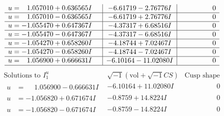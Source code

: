 \documentclass[1p]{elsarticle_modified}
\theoremstyle{definition}
\newcommand{\I}{\sqrt{-1}}
\begin{document}
$$\begin{array}{c|c|c}
\begin{aligned}
u &= \phantom{-}1.057010 + 0.636565 I\end{aligned}
 & -6.61719 - 2.76776 I & \phantom{-0.000000 } 0 \\ \hline\begin{aligned}
u &= \phantom{-}1.057010 - 0.636565 I\end{aligned}
 & -6.61719 + 2.76776 I & \phantom{-0.000000 } 0 \\ \hline\begin{aligned}
u &= -1.055470 + 0.647367 I\end{aligned}
 & -4.37317 + 6.68516 I & \phantom{-0.000000 } 0 \\ \hline\begin{aligned}
u &= -1.055470 - 0.647367 I\end{aligned}
 & -4.37317 - 6.68516 I & \phantom{-0.000000 } 0 \\ \hline\begin{aligned}
u &= -1.054270 + 0.658260 I\end{aligned}
 & -4.18744 + 7.02467 I & \phantom{-0.000000 } 0 \\ \hline\begin{aligned}
u &= -1.054270 - 0.658260 I\end{aligned}
 & -4.18744 - 7.02467 I & \phantom{-0.000000 } 0 \\ \hline\begin{aligned}
u &= \phantom{-}1.056900 + 0.666631 I\end{aligned}
 & -6.10164 - 11.02080 I & \phantom{-0.000000 } 0\\
 \hline 
 \end{array}$$\newpage$$\begin{array}{c|c|c}  
\text{Solutions to }I^u_{1}& \I (\text{vol} + \sqrt{-1}CS) & \text{Cusp shape}\\
 \hline 
\begin{aligned}
u &= \phantom{-}1.056900 - 0.666631 I\end{aligned}
 & -6.10164 + 11.02080 I & \phantom{-0.000000 } 0 \\ \hline\begin{aligned}
u &= -1.056820 + 0.671674 I\end{aligned}
 & -0.8759 + 14.8224 I & \phantom{-0.000000 } 0 \\ \hline\begin{aligned}
u &= -1.056820 - 0.671674 I\end{aligned}
 & -0.8759 - 14.8224 I & \phantom{-0.000000 } 0 \\ \hline\begin{aligned}

\end{aligned}
\end{array}$$
\end{document}
